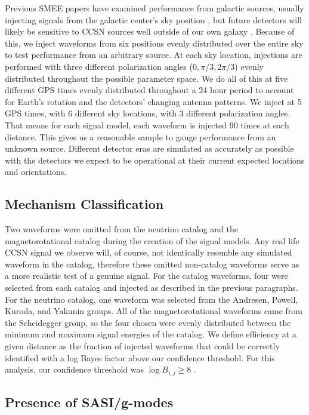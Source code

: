 \documentclass[letterpaper, aps, prd, twocolumn, superscriptaddress, showpacs, nofootinbib]{revtex4}
\begin{document}
Previous SMEE papers have examined performance from galactic sources, usually injecting signals from the galactic center's sky position \cite{powell:16b, 2017PhRvD..96l3013P}, but future detectors will likely be sensitive to CCSN sources well outside of our own galaxy \cite{0264-9381-27-19-194002, 2017CQGra..34d4001A}. Because of this, we inject waveforms from six positions evenly distributed over the entire sky to test performance from an arbitrary source. At each sky location, injections are performed with three different polarization angles ($0, \pi/3, 2\pi/3$) evenly distributed throughout the possible parameter space. We do all of this at five different GPS times evenly distributed throughout a 24 hour period to account for Earth's rotation and the detectors' changing antenna patterns.  We inject at 5 GPS times, with 6 different sky locations, with 3 different polarization angles. That means for each signal model, each waveform is injected 90 times at each distance. This gives us a reasonable sample to gauge performance from an unknown source. Different detector eras are simulated as accurately as possible with the detectors we expect to be operational at their current expected locations and orientations.

\subsection{Mechanism Classification}

Two waveforms were omitted from the neutrino catalog and the magnetorotational catalog during the creation of the signal models. Any real life CCSN signal we observe will, of course, not identically resemble any simulated waveform in the catalog, therefore these omitted non-catalog waveforms serve as a more realistic test of a genuine signal. For the catalog waveforms, four were selected from each catalog and injected as described in the previous paragraphs. For the neutrino catalog, one waveform was selected from the Andresen, Powell, Kuroda, and Yakunin groups. All of the magnetorotational waveforms came from the Scheidegger group, so the four chosen were evenly distributed between the minimum and maximum signal energies of the catalog. We define efficiency at a given distance as the fraction of injected waveforms that could be correctly identified with a log Bayes factor above our confidence threshold. For this analysis, our confidence threshold was $\log B_{i,j} \geq 8$ \cite{powell:16b, 2017PhRvD..96l3013P}.

\subsection{Presence of SASI/g-modes}
\end{document}

